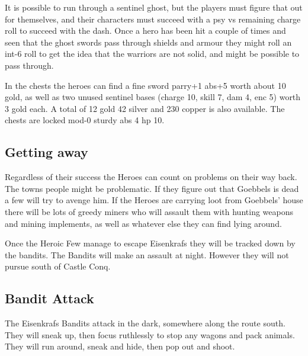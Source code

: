 \documentclass[11pt, twoside, titlepage, a4paper]{report}
\begin{document}
It is possible to run through a sentinel ghost, but the players must figure that out for themselves, and their characters must succeed with a psy vs remaining charge roll to succeed with the dash. Once a hero has been hit a couple of times and seen that the ghost swords pass through shields and armour they might roll an int-6 roll to get the idea that the warriors are not solid, and might be possible to pass through.

In the chests the heroes can find a fine sword parry+1 abs+5 worth about 10 gold, as well as two unused sentinel bases (charge 10, skill 7, dam 4, enc 5) worth 3 gold each. A total of 12 gold 42 silver and 230 copper is also available. The chests are locked mod-0 sturdy abs 4 hp 10.


\subsection*{Getting away}
Regardless of their success the Heroes can count on problems on their way back. The towns people might be problematic. If they figure out that Goebbels is dead a few will try to avenge him. If the Heroes are carrying loot from Goebbels' house there will be lots of greedy miners who will assault them with hunting weapons and mining implements, as well as whatever else they can find lying around.

Once the Heroic Few manage to escape Eisenkrafs they will be tracked down by the bandits. The Bandits will make an assault at night. However they will not pursue south of Castle Conq.


\subsection*{Bandit Attack}
The Eisenkrafs Bandits attack in the dark, somewhere along the route south. They will sneak up, then focus ruthlessly to stop any wagons and pack animals. They will run around, sneak and hide, then pop out and shoot.
















\end{document}
